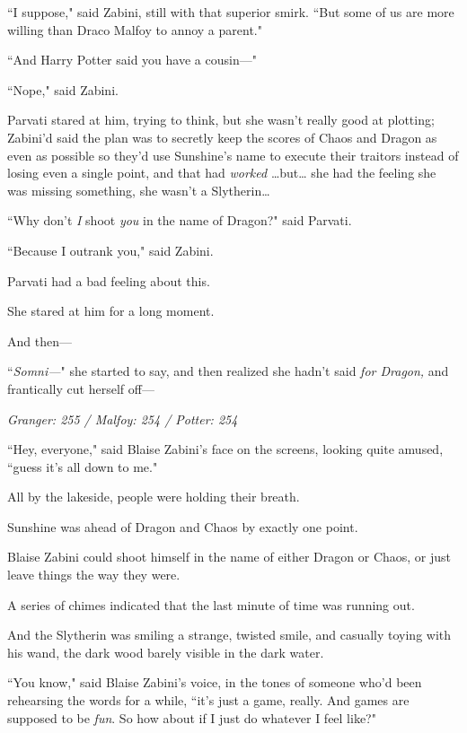``I suppose," said Zabini, still with that superior smirk. ``But some of us are more willing than Draco Malfoy to annoy a parent."

``And Harry Potter said you have a cousin—"

``Nope," said Zabini.

Parvati stared at him, trying to think, but she wasn't really good at plotting; Zabini'd said the plan was to secretly keep the scores of Chaos and Dragon as even as possible so they'd use Sunshine's name to execute their traitors instead of losing even a single point, and that had \emph{worked} {\ldots}but{\ldots} she had the feeling she was missing something, she wasn't a Slytherin{\ldots}

``Why don't \emph{I} shoot \emph{you} in the name of Dragon?" said Parvati.

``Because I outrank you," said Zabini.

Parvati had a bad feeling about this.

She stared at him for a long moment.

And then—

``\emph{Somni—}" she started to say, and then realized she hadn't said \emph{for Dragon,} and frantically cut herself off—

\later

\emph{Granger: 255 / Malfoy: 254 / Potter: 254}

``Hey, everyone," said Blaise Zabini's face on the screens, looking quite amused, ``guess it's all down to me."

All by the lakeside, people were holding their breath.

Sunshine was ahead of Dragon and Chaos by exactly one point.

Blaise Zabini could shoot himself in the name of either Dragon or Chaos, or just leave things the way they were.

A series of chimes indicated that the last minute of time was running out.

And the Slytherin was smiling a strange, twisted smile, and casually toying with his wand, the dark wood barely visible in the dark water.

``You know," said Blaise Zabini's voice, in the tones of someone who'd been rehearsing the words for a while, ``it's just a game, really. And games are supposed to be \emph{fun}. So how about if I just do whatever I feel like?"

